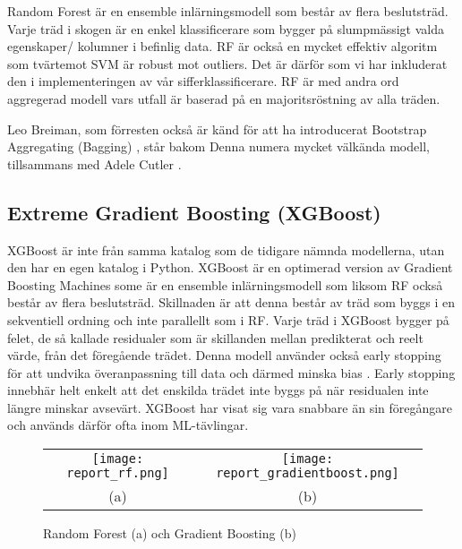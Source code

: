 \documentclass[12pt,a4paper]{article}
\begin{document}
Random Forest är en ensemble inlärningsmodell som består av flera beslutsträd. Varje träd i skogen är en enkel klassificerare som bygger på slumpmässigt valda egenskaper/ kolumner i befinlig data. RF är också en mycket effektiv algoritm som tvärtemot SVM är robust mot outliers. Det är därför som vi har inkluderat den i implementeringen av vår sifferklassificerare. RF är med andra ord aggregerad modell vars utfall är baserad på en majoritsröstning av alla träden.

Leo Breiman, som förresten också är känd för att ha introducerat Bootstrap Aggregating (Bagging) \citep{Geron}, står bakom Denna numera mycket välkända modell, tillsammans med Adele Cutler \citep{Izenman}.

\subsection{Extreme Gradient Boosting (XGBoost)}

XGBoost är inte från samma katalog som de tidigare nämnda modellerna, utan den har en egen katalog i Python. XGBoost är en optimerad version av Gradient Boosting Machines some är en ensemble inlärningsmodell som liksom RF också består av flera beslutsträd. Skillnaden är att denna består av träd som byggs i en sekventiell ordning och inte parallellt som i RF. Varje träd i XGBoost bygger på felet, de så kallade residualer som är skillanden mellan predikterat och reelt värde, från det föregående trädet. Denna modell använder också early stopping för att undvika överanpassning till data och därmed minska bias \citep{Geron}. Early stopping innebhär helt enkelt att det enskilda trädet inte byggs på när residualen inte längre minskar avsevärt. XGBoost har visat sig vara snabbare än sin föregångare \citep{Guido} och används därför ofta inom ML-tävlingar.

\begin{figure}[t]
    \centering
    \begin{tabular}{cc}
        \texttt{[image: report\_rf.png]} & 
        \texttt{[image: report\_gradientboost.png]} \\
        (a) & (b) \\
    \end{tabular}
    \caption{\footnotesize{Random Forest \citep{IBM} (a) och Gradient Boosting \citep{Geron} (b)}}
    \label{fig:rf_xgboost}
\end{figure}
\end{document}
